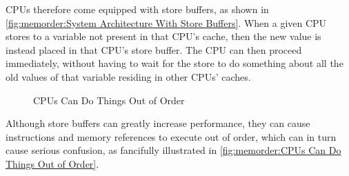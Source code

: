 CPUs therefore come equipped with store buffers, as shown in
\cref{fig:memorder:System Architecture With Store Buffers}.
When a given CPU stores to a variable
not present in that CPU's cache, then the new value
is instead placed in that CPU's store buffer.
The CPU can then proceed immediately, without having to wait for the
store to do something about all the old values of that variable
residing in other CPUs' caches.

\begin{figure}
\centering
{}
\caption{CPUs Can Do Things Out of Order}
\end{figure}

Although store buffers can greatly increase performance, they can cause
instructions and memory references to execute out of order, which can
in turn cause serious confusion, as fancifully illustrated in
\cref{fig:memorder:CPUs Can Do Things Out of Order}.

\begin{table}
\renewcommand*{\arraystretch}{1.1}
\small
\centering\OneColumnHSpace{-0.1in}
\caption{Memory Misordering:
			     Store-Buffering Sequence of Events}
\label{tab:memorder:Memory Misordering: Store-Buffering Sequence of Events}
\end{table}

